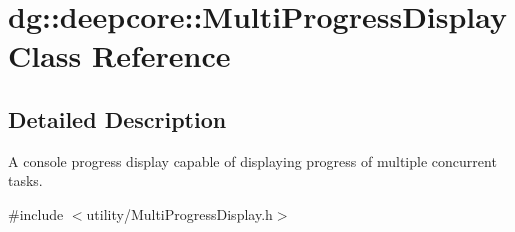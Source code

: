 \hypertarget{classdg_1_1deepcore_1_1_multi_progress_display}{}\section{dg\+:\+:deepcore\+:\+:Multi\+Progress\+Display Class Reference}
\label{classdg_1_1deepcore_1_1_multi_progress_display}


\subsection{Detailed Description}
A console progress display capable of displaying progress of multiple concurrent tasks. 

{\ttfamily \#include $<$utility/\+Multi\+Progress\+Display.\+h$>$}

